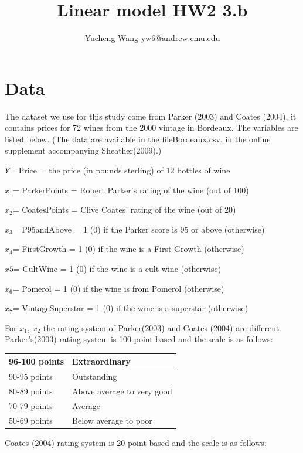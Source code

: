 \documentclass[11pt]{article}
\title{Linear model HW2 3.b}
\author{Yucheng Wang yw6@andrew.cmu.edu}
\date{}
\begin{document}
\maketitle

\section{Data}
 \Title \Discriptions
The dataset we use for this study come from Parker  (2003)  and  Coates  (2004), it contains prices for 72 wines from the 2000 vintage in Bordeaux. The variables are listed below. (The data are available in the fileBordeaux.csv, in the online supplement accompanying Sheather(2009).)

$Y$=   Price = the price (in pounds sterling) of 12 bottles of wine

$x_1$=   ParkerPoints = Robert Parker’s rating of the wine (out of 100)

$x_2$=   CoatesPoints = Clive Coates’ rating of the wine (out of 20)

$x_3$=   P95andAbove = 1 (0) if the Parker score is 95 or above (otherwise)

$x_4$=   FirstGrowth = 1 (0) if the wine is a First Growth (otherwise)

$x5$=   CultWine = 1 (0) if the wine is a cult wine (otherwise)

$x_6$=   Pomerol = 1 (0) if the wine is from Pomerol (otherwise)

$x_7$=   VintageSuperstar = 1 (0) if the wine is a superstar (otherwise)


For $x_1$, $x_2$ the rating system of Parker(2003) and Coates  (2004) are different.\\ Parker's(2003) rating system is 100-point based and the scale is as follows:
\begin{table}[h]
\begin{tabular}{|l|l|}
\hline
96-100 points & Extraordinary              \\ \hline
90-95 points  & Outstanding                \\ \hline
80-89 points  & Above average to very good \\ \hline
70-79 points  & Average                    \\ \hline
50-69 points  & Below average to poor      \\ \hline
\end{tabular}
\end{table}
Coates  (2004) rating system is 20-point based and the scale is as follows:\\\\\\\\\\\\\\\\\\
\end{document}
